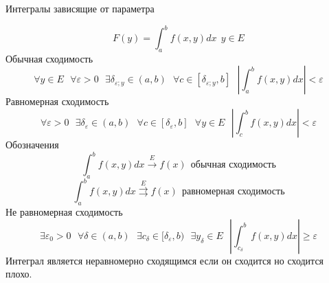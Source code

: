 \begin{title}
  Интегралы зависящие от параметра
\end{title}

\begin{define}
  $$
  F(y) = \int_a^b f(x,y) dx ~~ y \in E
  $$
  Обычная сходимость
  $$
  \forall y \in E
  ~~~
  \forall \varepsilon > 0
  ~~~
  \exists \delta_{\varepsilon; y} \in (a, b)
  ~~~
  \forall c \in [\delta_{\varepsilon; y}, b]
  ~~~
  \left|
    \int_a^b f(x,y) dx
  \right|
  < \varepsilon
  $$
  Равномерная сходимость
  $$
  \forall \varepsilon > 0
  ~~~
  \exists \delta_{\varepsilon} \in (a,b)
  ~~~
  \forall c \in [\delta_{\varepsilon}, b]
  ~~~
  \forall y \in E
  ~~~
  \left|
    \int_c^b f(x,y) dx
  \right|
  < \varepsilon
  $$
  Обозначения
  $$
  \int_a^b f(x,y) dx \stackrel{E}{\to} f(x) ~~ \text{обычная сходимость}
  $$
  $$
  \int_a^b f(x,y) dx \stackrel{E}{\rightrightarrows} f(x) ~~
  \text{равномерная сходимость}
  $$
  Не равномерная сходимость
  $$
  \exists \varepsilon_0 > 0
  ~~~
  \forall \delta \in (a,b)
  ~~~
  \exists c_{\delta} \in [\delta_{\varepsilon}, b)
  ~~~
  \exists y_{\delta} \in E
  ~~~
  \left|
    \int_{c_{\delta}}^b f(x,y) dx
  \right|
  \ge \varepsilon
  $$
  Интеграл является неравномерно сходящимся если он сходится но сходится плохо.
\end{define}
